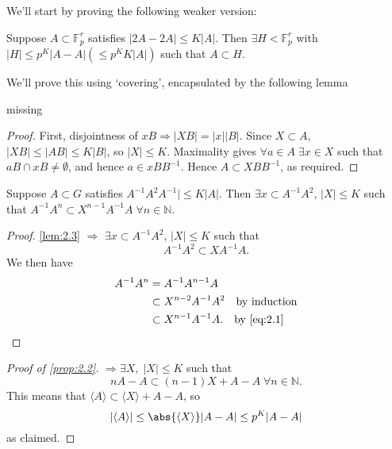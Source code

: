 \documentclass{article}
\newcommand{\F}{\mathbb{F}}
\numberwithin{equation}{section}
\begin{document}
We'll start by proving the following weaker version:
\begin{nprop}\label{prop:2.2}
  Suppose $A \subset \F_p^r$ satisfies $|2A - 2A| \leq K|A|$. Then $\exists H < \F_p^r$ with $|H| \leq p^K |A - A| (\leq p^K K |A|)$ such that $A \subset H$.
\end{nprop}
We'll prove this using `covering', encapsulated by the following lemma
\begin{nlemma}\label{lem:2.3}
  missing %
\end{nlemma}
\begin{proof}
  First, disjointness of $xB \Rightarrow |XB| = |x| |B|$. Since $X \subset A$, $|XB| \leq |AB| \leq K|B|$, so $|X| \leq K$.
  Maximality gives $\forall a \in A \; \exists x \in X$ such that $aB \cap xB \neq \emptyset$, and hence $a \in x B B^{-1}$.
  Hence $A \subset X B B^{-1}$, as required.
\end{proof}
\begin{nlemma}\label{lem:2.4}
  Suppose $A \subset G$ satisfies $A^{-1} A^2 A^{-1}| \leq K|A|$. Then $\exists x \subset A^{-1} A^2$, $|X| \leq K$ such that $A^{-1} A^n \subset X^{n-1} A^{-1} A \; \forall n \in \mathbb{N}$.
\end{nlemma}
\begin{proof}
  \cref{lem:2.3} $\Rightarrow$ $\exists x \subset A^{-1} A^2$, $|X| \leq K$ such that
  \begin{equation}
    A^{-1} A^2 \subset X A^{-1} A. \label{eq:2.1}
  \end{equation}
  We then have
  \begin{align*}
    A^{-1} A^n &= A^{-1} A^{n-1} A \\
               &\subset X^{n-2} A^{-1} A^2 \quad\text{by induction}\\
               & \subset X^{n-1} A^{-1} A. \quad\text{by \eqref{eq:2.1}}
  \end{align*}
\end{proof}
\begin{proof}[Proof of \cref{prop:2.2}]
   $\Rightarrow \exists X,\; |X| \leq K$ such that
  \begin{equation*}
    nA - A \subset (n-1) X + A - A \; \forall n \in \mathbb{N}.
  \end{equation*}
  This means that
  $\langle A \rangle \subset \langle X \rangle + A - A$, so
  \begin{equation*}
    |\langle A \rangle | \leq \abs{\langle X \rangle} |A-A| \leq p^K |A-A|
  \end{equation*}
  as claimed.
\end{proof}
\end{document}
